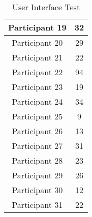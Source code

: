 \begin{table}[htbp]
\begin{tabular}{|c|c|}
    Participant 19             & 32                                \\ \hline
    Participant 20             & 29                                \\ \hline
    Participant 21             & 22                                \\ \hline
    Participant 22             & 94                                \\ \hline
    Participant 23             & 19                                \\ \hline
    Participant 24             & 34                                \\ \hline
    Participant 25             & 9                                \\ \hline
    Participant 26             & 13                                \\ \hline
    Participant 27             & 31                                \\ \hline
    Participant 28             & 23                                \\ \hline
    Participant 29             & 26                                \\ \hline
    Participant 30             & 12                                \\ \hline
    Participant 31             & 22                                  \\ \hline
    \end{tabular}
    \caption{User Interface Test}
    \label{fig:heatmapTimes}
    \end{table}